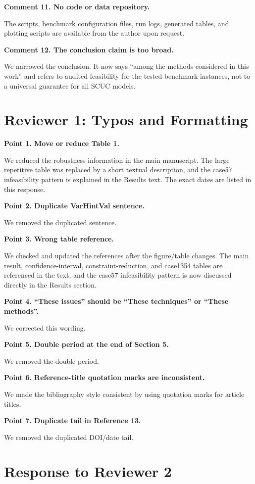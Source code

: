 \documentclass[11pt,a4paper]{article}
\begin{document}
\textbf{Comment 11. No code or data repository.}

The scripts, benchmark configuration files, run logs, generated tables, and plotting scripts are available from the author upon request.

\textbf{Comment 12. The conclusion claim is too broad.}

We narrowed the conclusion. It now says ``among the methods considered in this work'' and refers to audited feasibility for the tested benchmark instances, not to a universal guarantee for all SCUC models.

\section*{Reviewer 1: Typos and Formatting}

\textbf{Point 1. Move or reduce Table 1.}

We reduced the robustness information in the main manuscript. The large repetitive table was replaced by a short textual description, and the case57 infeasibility pattern is explained in the Results text. The exact dates are listed in this response.

\textbf{Point 2. Duplicate VarHintVal sentence.}

We removed the duplicated sentence.

\textbf{Point 3. Wrong table reference.}

We checked and updated the references after the figure/table changes. The main result, confidence-interval, constraint-reduction, and case1354 tables are referenced in the text, and the case57 infeasibility pattern is now discussed directly in the Results section.

\textbf{Point 4. ``These issues'' should be ``These techniques'' or ``These methods''.}

We corrected this wording.

\textbf{Point 5. Double period at the end of Section 5.}

We removed the double period.

\textbf{Point 6. Reference-title quotation marks are inconsistent.}

We made the bibliography style consistent by using quotation marks for article titles.

\textbf{Point 7. Duplicate tail in Reference 13.}

We removed the duplicated DOI/date tail.

\section*{Response to Reviewer 2}
\end{document}
